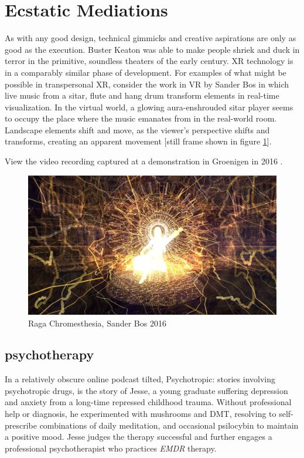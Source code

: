 \documentclass{UIdahoMastersThesis}
\begin{document}
\section{Ecstatic Mediations}

As with any good design, technical gimmicks and creative aspirations are only as good as the execution. Buster Keaton was able to make people shriek and duck in terror in the primitive, soundless theaters of the early  century. \ac{XR} technology is in a comparably similar phase of development. For examples of what might be possible in transpersonal \ac{XR}, consider the work in \ac{VR} by Sander Bos in which live music from a sitar, flute and hang drum transform elements in real-time visualization. In the virtual world, a glowing aura-enshrouded sitar player seems to occupy the place where the music emanates from in the real-world room. Landscape elements shift and move, as the viewer's perspective shifts and transforms, creating an apparent movement [still frame shown in figure \ref{fig:bos}].

View the video recording captured at a demonstration in Groenigen in 2016 \cite{noauthor_raga_nodate}.

\begin{figure}[h!]
	\centering
	\includegraphics[width=0.81\linewidth]{bos.png}
	\caption{Raga Chromesthesia, Sander Bos 2016}
	\label{fig:bos}
\end{figure}

\subsection{psychotherapy}

In a relatively obscure online podcast tilted, Psychotropic: stories involving psychotropic drugs, is the story of Jesse, a young graduate suffering depression and anxiety from a long-time repressed childhood trauma. Without professional help or diagnosis, he experimented with mushrooms and DMT, resolving to self-prescribe combinations of daily meditation, and occasional psilocybin to maintain a positive mood. Jesse judges the therapy successful and further engages a professional psychotherapist who practices \textit{\ac{EMDR}} therapy. 
\end{document}
